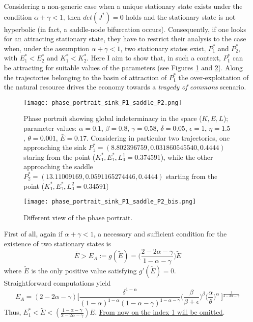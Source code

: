 Considering a non-generic case when a unique stationary state exists under the condition $\alpha+\gamma<1$, then $det(J^*)=0$ holds and the stationary state is not hyperbolic (in fact, a saddle-node bifurcation occurs). Consequently, if one looks for an attracting stationary state, they have to restrict their analysis to the case when, under the assumption $\alpha+\gamma<1$, two stationary states exist, $P_1^*$ and $P_2^*$, with $E_1^* < E_2^*$ and $K_1^* < K_2^*$. Here I aim to show that, in such a context, $P_1^*$ can be attracting for suitable values of the parameters (see Figures \ref{fig:attract_P1_saddle_P2} and \ref{fig:attract_P1_saddle_P2_diff_view}). Along the trajectories belonging to the basin of attraction of $P_1^*$ the over-exploitation of the natural resource drives the economy towards a \textit{tragedy of commons} scenario.
\begin{figure}[h!]
	\centering
	\texttt{[image: phase\_portrait\_sink\_P1\_saddle\_P2.png]}
	\caption{Phase portrait showing global indeterminacy in the space ($K,E,L$); parameter values: $\alpha=0.1$, $\beta=0.8$, $\gamma=0.58$, $\delta=0.05$, $\epsilon=1$, $\eta=1.5$, $\theta=0.001$, $\bar{E}=0.17$. Considering in particular two trajectories, one approaching the sink $P_1^*=(8.802396759,0.031860545540,0.4444)$ staring from the point ($K_1^*,E_1^*,L_0^1 =0.374591$), while the other approaching the saddle $P_2^*=(13.11009169,0.0591165274446,0.4444)$ starting from the point ($K_1^*,E_1^*,L_0^2 =0.34591$)}
	\label{fig:attract_P1_saddle_P2}
\end{figure}
\begin{figure}[h!]
	\centering
	\texttt{[image: phase\_portrait\_sink\_P1\_saddle\_P2\_bis.png]}
	\caption{Different view of the phase portrait.}
	\label{fig:attract_P1_saddle_P2_diff_view}
\end{figure}

First of all, again if $\alpha+\gamma<1$, a necessary and sufficient condition for the existence of two stationary states is
\begin{equation}
	\bar{E}>E_A := g(\tilde{E})=\Bigg(\frac{2-2\alpha-\gamma}{1-\alpha-\gamma}\Bigg) \tilde{E}
\end{equation}
where $\tilde{E}$ is the only positive value satisfying $g'(\tilde{E})=0$. \\
Straightforward computations yield 
\begin{equation} \label{eqn:E_A}
	E_A =(2-2\alpha-\gamma)\Bigg[\frac{\delta^{1-\alpha}}{(1-\alpha)^{1-\alpha}(1-\alpha-\gamma)^{1-\alpha-\gamma}} \Bigg(\frac{\beta}{\beta+\epsilon}\Bigg)^{\beta} \Bigg(\frac{\alpha}{\theta}\Bigg)^{\alpha}\ \Bigg]^{\frac{1}{2-2\alpha-\gamma}}
\end{equation}
Thus, $E_1^*<\tilde{E}<(\frac{1-\alpha-\gamma}{2-2\alpha-\gamma})\bar{E}$.
\underline{From now on the index 1 will be omitted}. 

